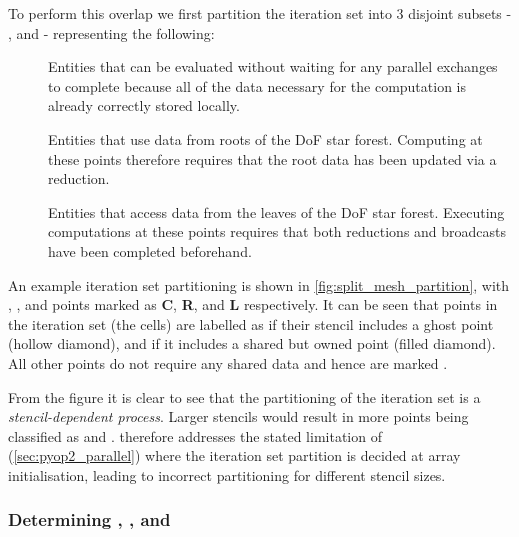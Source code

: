 \documentclass[thesis]{subfiles}
\begin{document}
To perform this overlap we first partition the iteration set into 3 disjoint subsets - \coreiter, \rootiter and \leafiter - representing the following:
\begin{description}
  \item[\coreiter]
    Entities that can be evaluated without waiting for any parallel exchanges to complete because all of the data necessary for the computation is already correctly stored locally.

  \item[\rootiter]
    Entities that use data from roots of the DoF star forest.
    Computing at these points therefore requires that the root data has been updated via a reduction.

  \item[\leafiter]
    Entities that access data from the leaves of the DoF star forest.
    Executing computations at these points requires that both reductions and broadcasts have been completed beforehand.
\end{description}

An example iteration set partitioning is shown in \cref{fig:split_mesh_partition}, with \coreiter, \rootiter, and \leafiter points marked as \textbf{C}, \textbf{R}, and \textbf{L} respectively.
It can be seen that points in the iteration set (the cells) are labelled as \leafiter if their stencil includes a ghost point (hollow diamond), and \rootiter if it includes a shared but owned point (filled diamond).
All other points do not require any shared data and hence are marked \coreiter.

From the figure it is clear to see that the partitioning of the iteration set is a \emph{stencil-dependent process}.
Larger stencils would result in more points being classified as \rootiter and \leafiter.
 therefore addresses the stated limitation of  (\cref{sec:pyop2_parallel}) where the iteration set partition is decided at array initialisation, leading to incorrect partitioning for different stencil sizes.

\subsubsection{Determining \coreiter, \rootiter, and \leafiter}
\end{document}
